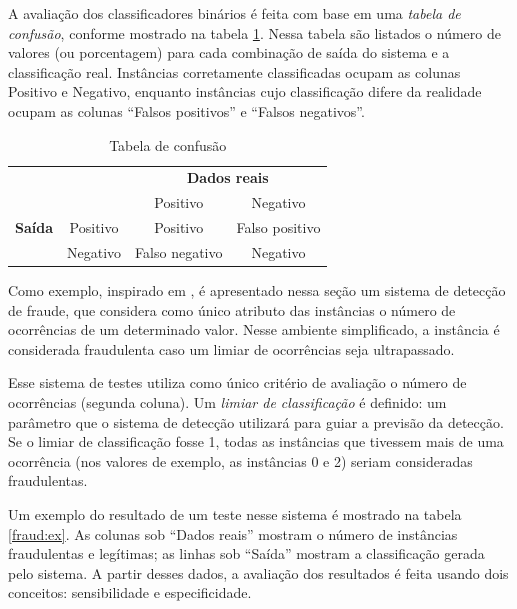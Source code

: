 A avaliação dos classificadores binários é feita com base em uma \emph{tabela de confusão}, conforme mostrado na tabela \ref{fraud:confusion}. Nessa tabela são listados o número de valores (ou porcentagem) para cada combinação de saída do sistema e a classificação real. Instâncias corretamente classificadas ocupam as colunas Positivo e Negativo, enquanto instâncias cujo classificação difere da realidade ocupam as colunas ``Falsos positivos'' e ``Falsos negativos''.

\renewcommand{\arraystretch}{1.5}
\begin{table}[h!]
    \vspace{1cm}
    \caption{Tabela de confusão}
    \centering
    \begin{tabular}{c l c c}
        & & \multicolumn{2}{c}{\textbf{Dados reais}} \\
        \multirow{3}{5mm}{\begin{sideways}\parbox{20mm}{\textbf{Saída}}\end{sideways}} & \multicolumn{1}{c|}{} & Positivo & Negativo \\
        \cline{2-4}
        & \multicolumn{1}{c|}{Positivo} & Positivo & Falso positivo\\
        & \multicolumn{1}{c|}{Negativo} & Falso negativo & Negativo\\
    \end{tabular}
    \label{fraud:confusion}
    \vspace{1cm}
\end{table}

Como exemplo, inspirado em \citet{Bewick2004}, é apresentado nessa seção um sistema de detecção de fraude, que considera como único atributo das instâncias o número de ocorrências de um determinado valor. Nesse ambiente simplificado, a instância é considerada fraudulenta caso um limiar de ocorrências seja ultrapassado.

Esse sistema de testes utiliza como único critério de avaliação o número de ocorrências (segunda coluna). Um \emph{limiar de classificação} é definido: um parâmetro que o sistema de detecção utilizará para guiar a previsão da detecção. Se o limiar de classificação fosse 1, todas as instâncias que tivessem mais de uma ocorrência (nos valores de exemplo, as instâncias 0 e 2) seriam consideradas fraudulentas.

Um exemplo do resultado de um teste nesse sistema é mostrado na tabela \ref{fraud:ex}. As colunas sob ``Dados reais'' mostram o número de instâncias fraudulentas e legítimas; as linhas sob ``Saída'' mostram a classificação gerada pelo sistema. A partir desses dados, a avaliação dos resultados é feita usando dois conceitos: sensibilidade e especificidade.


